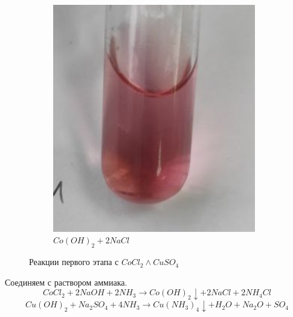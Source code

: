 \begin{figure}[h]
\begin{subfigure}[b]{0.45\textwidth}
        \includegraphics[width=0.97\textwidth]{Ex_5/Co_1.jpg}
        \caption{$Co(OH)_2 + 2NaCl$}
    \end{subfigure}
    \caption{Реакции первого этапа с $CoCl_2 \land CuSO_4$}
\end{figure}

Соединяем с раствором аммиака.
\begin{equation}
    CoCl_2 + 2NaOH + 2NH_3 \xrightarrow{} Co(OH)_2 \downarrow + 2NaCl + 2NH_4Cl
\end{equation}
\begin{equation}
    Cu(OH)_2 + Na_2SO_4 + 4NH_3 \xrightarrow{} Cu(NH_3)_4\downarrow + H_2O + Na_2O + SO_4
\end{equation}

